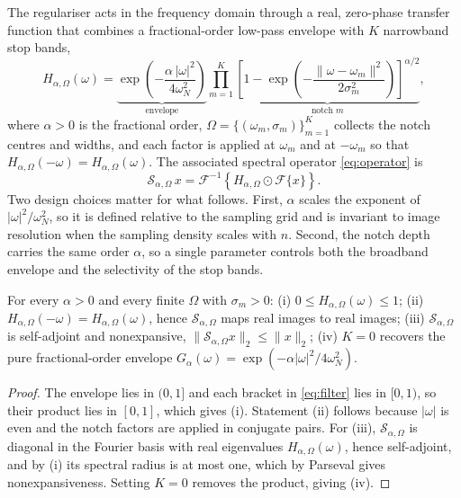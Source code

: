 The regulariser acts in the frequency domain through a real, zero-phase
transfer function that combines a fractional-order low-pass envelope with
$K$ narrowband stop bands,
\begin{equation}
  H_{\alpha,\Omega}(\omega)=
  \underbrace{\exp\!\left(-\frac{\alpha\,|\omega|^{2}}{4\omega_{N}^{2}}\right)}_{\text{envelope}}
  \prod_{m=1}^{K}
  \underbrace{\left[1-\exp\!\left(-\frac{\|\omega-\omega_{m}\|^{2}}{2\sigma_{m}^{2}}\right)\right]^{\alpha/2}}_{\text{notch }m},
  \label{eq:filter}
\end{equation}
where $\alpha>0$ is the fractional order,
$\Omega=\{(\omega_{m},\sigma_{m})\}_{m=1}^{K}$ collects the notch centres and
widths, and each factor is applied at $\omega_{m}$ and at $-\omega_{m}$ so
that $H_{\alpha,\Omega}(-\omega)=H_{\alpha,\Omega}(\omega)$. The associated
spectral operator \eqref{eq:operator} is
\begin{equation}
  \mathcal{S}_{\alpha,\Omega}\,x=\mathcal{F}^{-1}\!\left\{H_{\alpha,\Omega}\odot\mathcal{F}\{x\}\right\}.
  \label{eq:operator}
\end{equation}
Two design choices matter for what follows. First, $\alpha$ scales the
exponent of $|\omega|^{2}/\omega_{N}^{2}$, so it is defined relative to the
sampling grid and is invariant to image resolution when the sampling density
scales with $n$. Second, the notch depth carries the same order $\alpha$, so
a single parameter controls both the broadband envelope and the selectivity
of the stop bands.

\begin{proposition}
\label{prop:filter}
For every $\alpha>0$ and every finite $\Omega$ with $\sigma_{m}>0$:
(i) $0\le H_{\alpha,\Omega}(\omega)\le 1$;
(ii) $H_{\alpha,\Omega}(-\omega)=H_{\alpha,\Omega}(\omega)$, hence
$\mathcal{S}_{\alpha,\Omega}$ maps real images to real images;
(iii) $\mathcal{S}_{\alpha,\Omega}$ is self-adjoint and nonexpansive,
$\|\mathcal{S}_{\alpha,\Omega}x\|_{2}\le\|x\|_{2}$;
(iv) $K=0$ recovers the pure fractional-order envelope
$G_{\alpha}(\omega)=\exp(-\alpha|\omega|^{2}/4\omega_{N}^{2})$.
\end{proposition}

\begin{proof}
The envelope lies in $(0,1]$ and each bracket in \eqref{eq:filter} lies in
$[0,1)$, so their product lies in $[0,1]$, which gives (i). Statement (ii)
follows because $|\omega|$ is even and the notch factors are applied in
conjugate pairs. For (iii), $\mathcal{S}_{\alpha,\Omega}$ is diagonal in the
Fourier basis with real eigenvalues $H_{\alpha,\Omega}(\omega)$, hence
self-adjoint, and by (i) its spectral radius is at most one, which by
Parseval gives nonexpansiveness. Setting $K=0$ removes the product, giving
(iv).
\end{proof}

